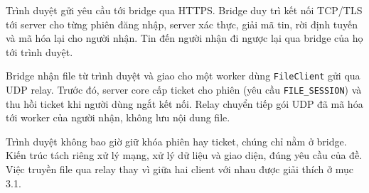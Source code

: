 Trình duyệt gửi yêu cầu tới bridge qua HTTPS. Bridge duy trì kết nối TCP/TLS tới server cho từng phiên đăng nhập, server xác thực, giải mã tin, rời định tuyến và mã hóa lại cho người nhận. Tin đến người nhận đi ngược lại qua bridge của họ tới trình duyệt.

Bridge nhận file từ trình duyệt và giao cho một worker dùng \texttt{FileClient} gửi qua UDP relay. Trước đó, server core cấp ticket cho phiên (yêu cầu \texttt{FILE\_SESSION}) và thu hồi ticket khi người dùng ngắt kết nối. Relay chuyển tiếp gói UDP đã mã hóa tới worker của người nhận, không lưu nội dung file.

Trình duyệt không bao giờ giữ khóa phiên hay ticket, chúng chỉ nằm ở bridge. Kiến trúc tách riêng xử lý mạng, xử lý dữ liệu và giao diện, đúng yêu cầu của đề. Việc truyền file qua relay thay vì giữa hai client với nhau được giải thích ở mục 3.1.